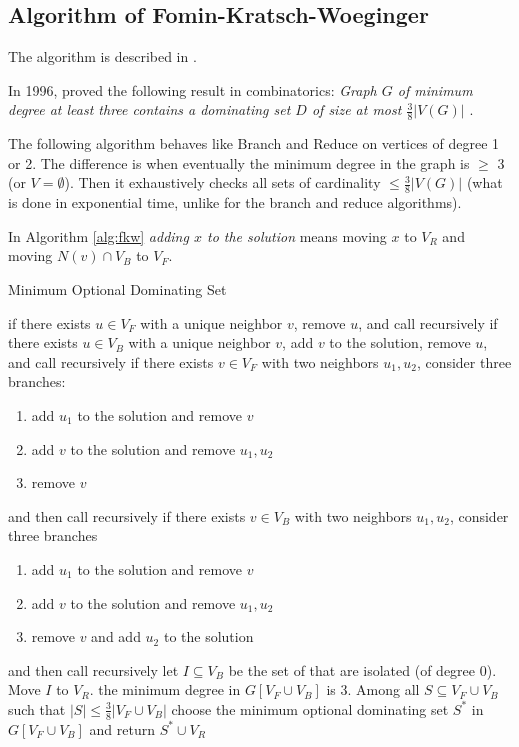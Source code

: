 \subsection{Algorithm of Fomin-Kratsch-Woeginger}
The algorithm is described in \cite{FominKratschWoeginger10.1007/978-3-540-30559-0_21}.
\par In 1996, \citeauthor{reed_1996} proved the following result in combinatorics:
\textit{Graph $G$ of minimum degree at least three contains a dominating set $D$ of size at most $\frac{3}{8}|V(G)|$} \cite{reed_1996}.
\par The following algorithm behaves like Branch and Reduce on vertices of degree 1 or 2. The difference is when eventually the minimum degree in the graph is $\geq$ 3 (or $V = \emptyset$). Then it exhaustively checks all sets of cardinality $\leq \frac{3}{8}|V(G)|$ (what is done in exponential time, unlike for the branch and reduce algorithms).
\par In Algorithm \ref{alg:fkw} \textit{adding $x$ to the solution} means moving $x$ to $V_R$ and moving $N(v) \cap V_B$ to $V_F$.
\begin{algorithm}
\caption{Minimum Optional Dominating Set}
\label{alg:fkw}
\begin{algorithmic}[1]
 
\State if there exists $u\in V_F$ with a unique neighbor $v$, remove $u$, and call recursively
\State if there exists $u\in V_B$ with a unique neighbor $v$, add $v$ to the solution, remove $u$, and call recursively
\State if there exists $v\in V_F$ with two neighbors $u_1, u_2$, consider three branches:
\begin{enumerate}
    \item add $u_1$ to the solution and remove $v$
    \item add $v$ to the solution and remove $u_1, u_2$
    \item remove $v$
\end{enumerate}
and then call recursively
\State if there exists $v\in V_B$ with two neighbors $u_1, u_2$, consider three branches
\begin{enumerate}
    \item add $u_1$ to the solution and remove $v$
    \item add $v$ to the solution and remove $u_1, u_2$
    \item remove $v$ and add $u_2$ to the solution
\end{enumerate}
and then call recursively
\State let $I \subseteq V_B$ be the set of that are isolated (of degree 0). Move $I$ to $V_R$.
\State the minimum degree in $G[V_F \cup V_B]$ is 3. Among all $S \subseteq V_F \cup V_B$ such that $|S| \leq \frac{3}{8}|V_F \cup V_B|$ choose the minimum optional dominating set $S^*$ in $G[V_F \cup V_B]$ and return $S^* \cup V_R$
\EndProcedure
\end{algorithmic}
\end{algorithm}

